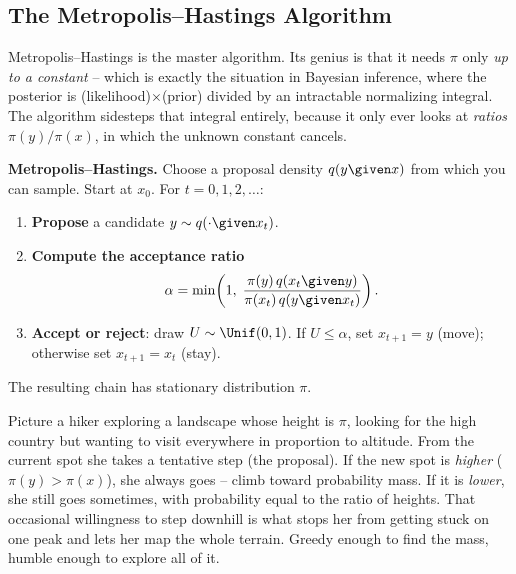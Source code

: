 \subsection{The Metropolis--Hastings Algorithm}
\label{ch35:metropolis}

Metropolis--Hastings is the master algorithm. Its genius is that it needs $\pi$
only \emph{up to a constant} -- which is exactly the situation in Bayesian
inference, where the posterior is (likelihood)$\times$(prior) divided by an
intractable normalizing integral. The algorithm sidesteps that integral entirely,
because it only ever looks at \emph{ratios} $\pi(y)/\pi(x)$, in which the unknown
constant cancels.

\begin{formalbox}
\textbf{Metropolis--Hastings.} Choose a proposal density $q(y \given x)$ from
which you can sample. Start at $x_0$. For $t = 0, 1, 2, \dots$:
\begin{enumerate}
  \item \textbf{Propose} a candidate $y \sim q(\cdot \given x_t)$.
  \item \textbf{Compute the acceptance ratio}
        \[
          \alpha = \min\!\left(1,\;
          \frac{\pi(y)\, q(x_t \given y)}{\pi(x_t)\, q(y \given x_t)}\right).
        \]
  \item \textbf{Accept or reject}: draw $U \sim \Unif(0,1)$. If $U \le \alpha$,
        set $x_{t+1} = y$ (move); otherwise set $x_{t+1} = x_t$ (stay).
\end{enumerate}
The resulting chain has stationary distribution $\pi$.
\end{formalbox}

\begin{intuitionbox}
Picture a hiker exploring a landscape whose height is $\pi$, looking for the high
country but wanting to visit everywhere in proportion to altitude. From the
current spot she takes a tentative step (the proposal). If the new spot is
\emph{higher} ($\pi(y) > \pi(x)$), she always goes -- climb toward probability
mass. If it is \emph{lower}, she still goes sometimes, with probability equal to
the ratio of heights. That occasional willingness to step downhill is what stops
her from getting stuck on one peak and lets her map the whole terrain. Greedy
enough to find the mass, humble enough to explore all of it.
\end{intuitionbox}

